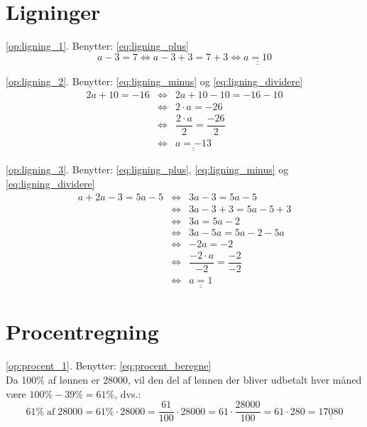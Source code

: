 \documentclass[11pt,a5paper,fleqn,leqno]{book}
\begin{document}
\section{Ligninger}

\ref{op:ligning_1}. Benytter: \eqref{eq:ligning_plus}
\[a-3=7 \Leftrightarrow a-3+3=7+3 \Leftrightarrow \underline{\underline{a = 10}}\]

\ref{op:ligning_2}. Benytter: \eqref{eq:ligning_minus} og \eqref{eq:ligning_dividere}
\begin{displaymath}\begin{array}{rcl}
2a+10=-16 & \Leftrightarrow & 2a+10-10=-16-10 \\
          & \Leftrightarrow & 2 \cdot a = -26 \\
          & \Leftrightarrow & \dfrac{2 \cdot a}{2} = \dfrac{-26}{2} \\
          & \Leftrightarrow & \underline{\underline{a = -13}}
\end{array}\end{displaymath}

\ref{op:ligning_3}. Benytter: \eqref{eq:ligning_plus}, \eqref{eq:ligning_minus} og \eqref{eq:ligning_dividere}
\begin{displaymath}\begin{array}{rcl}
a+2a-3 = 5a -5 & \Leftrightarrow & 3a-3 = 5a-5 \\
               & \Leftrightarrow & 3a-3+3 = 5a-5+3 \\
               & \Leftrightarrow & 3a = 5a-2 \\
               & \Leftrightarrow & 3a - 5a = 5a-2-5a \\
               & \Leftrightarrow & -2a = -2 \\
               & \Leftrightarrow & \dfrac{-2 \cdot a}{-2} = \dfrac{-2}{-2} \\
               & \Leftrightarrow & \underline{\underline{a = 1}}
\end{array}\end{displaymath}

\section{Procentregning}

\ref{op:procent_1}. Benytter: \eqref{eq:procent_beregne} \\
Da 100\% af lønnen er $28000$, vil den del af lønnen der bliver udbetalt hver måned være $100\% - 39\% = 61\%$, dvs.:
\[61\% \; \text{af} \; 28000 = 61\% \cdot 28000 = \frac{61}{100} \cdot 28000 = 61 \cdot \frac{28000}{100} = 61 \cdot 280 = \underline{\underline{17080}}\]
\end{document}
